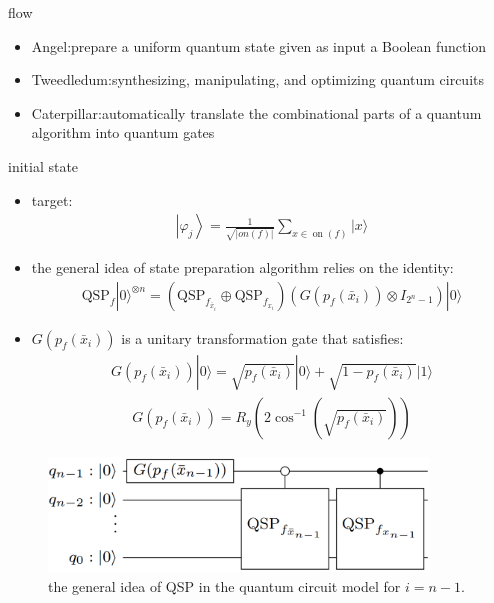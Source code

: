 \begin{frame}{flow}
  \begin{itemize}
    \item Angel:prepare a uniform quantum state
    given as input a Boolean function
    \item Tweedledum:synthesizing,
    manipulating, and optimizing quantum circuits
    \item Caterpillar:automatically translate the combinational parts of a quantum
    algorithm into quantum gates
  \end{itemize}
\end{frame}
\begin{frame}{initial state }
  \begin{itemize}
    \item target:
    \begin{align}
      \left|\varphi_{j}\right\rangle= \frac{1}{\sqrt{|on(f)|}} \sum_{x \in \operatorname{on}(f)}|x\rangle
    \end{align}
    \item the  general  idea  of  state  preparation  algorithm  relies on the identity:
    \begin{align}
      \mathrm{QSP}_{f}|0\rangle^{\otimes n} = \left(\mathrm{QSP}_{f_{\bar{x}_{i}}} \oplus \mathrm{QSP}_{f_{x_{i}}}\right)\left(G\left(p_{f}\left(\bar{x}_{i}\right)\right) \otimes I_{2^{n}-1}\right)|0\rangle
    \end{align}
    \item $G\left(p_{f}\left(\bar{x}_{i}\right)\right)$ is a unitary transformation gate that satisfies:
    \begin{align}
      G(p_{f}\left(\bar{x}_{i}\right))|0\rangle = \sqrt{p_{f}\left(\bar{x}_{i}\right)}|0\rangle+\sqrt{1-p_{f}\left(\bar{x}_{i}\right)}|1\rangle
    \end{align}
    \begin{align}
      G\left(p_{f}\left(\bar{x}_{i}\right)\right) = R_{y}\left(2 \cos ^{-1}\left(\sqrt{p_{f}\left(\bar{x}_{i}\right)}\right)\right)
    \end{align}
  \end{itemize}
\end{frame}
\begin{frame}
  \begin{figure}[htbq]
    \centering
    \includegraphics[width=0.9\textwidth]{figure/QSP.png}
    \caption{the general idea of QSP in the quantum  circuit  model for $i=n-1$.} 
    \label{fig-qsp}
  \end{figure}
\end{frame}
